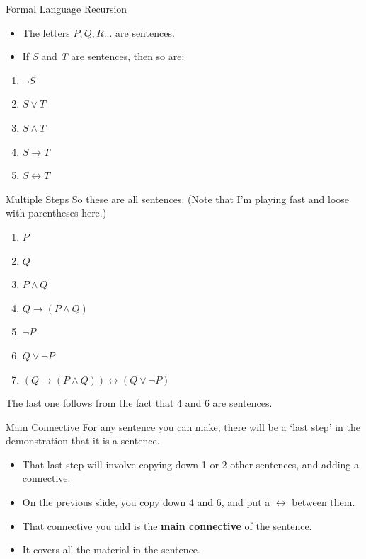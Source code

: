 \documentclass[
  ignorenonframetext,
]{beamer}
\providecommand{\tightlist}{%
  \setlength{\itemsep}{0pt}\setlength{\parskip}{0pt}}
\renewcommand{\,}{\text{, }}
\begin{document}
\begin{frame}{Formal Language Recursion}
\protect\hypertarget{formal-language-recursion}{}
\begin{itemize}
\tightlist
\item
  The letters \(P, Q, R...\) are sentences.
\item
  If \emph{S} and \emph{T} are sentences, then so are:
\end{itemize}

\begin{enumerate}
\tightlist
\item
  \(\neg S\)
\item
  \(S \vee T\)
\item
  \(S \wedge T\)
\item
  \(S \rightarrow T\)
\item
  \(S \leftrightarrow T\)
\end{enumerate}
\end{frame}

\begin{frame}{Multiple Steps}
\protect\hypertarget{multiple-steps}{}
So these are all sentences. (Note that I'm playing fast and loose with
parentheses here.)

\begin{enumerate}
\tightlist
\item
  \(P\)
\item
  \(Q\)
\item
  \(P \wedge Q\)
\item
  \(Q \rightarrow (P \wedge Q)\)
\item
  \(\neg P\)
\item
  \(Q \vee \neg P\)
\item
  \((Q \rightarrow (P \wedge Q)) \leftrightarrow (Q \vee \neg P)\)
\end{enumerate}

The last one follows from the fact that 4 and 6 are sentences.
\end{frame}

\begin{frame}{Main Connective}
\protect\hypertarget{main-connective}{}
For any sentence you can make, there will be a `last step' in the
demonstration that it is a sentence.

\begin{itemize}
\tightlist
\item
  That last step will involve copying down 1 or 2 other sentences, and
  adding a connective.
\item
  On the previous slide, you copy down 4 and 6, and put a
  \(\leftrightarrow\) between them.
\item
  That connective you add is the \textbf{main connective} of the
  sentence.
\item
  It covers all the material in the sentence.
\end{itemize}
\end{frame}
\end{document}
